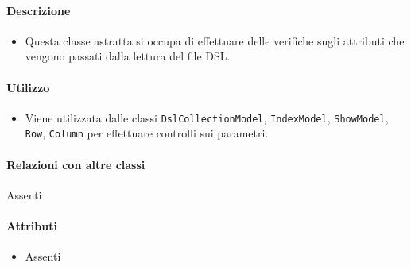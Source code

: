 \paragraph*{Descrizione}
\begin{itemize}
\item[] Questa classe astratta si occupa di effettuare delle verifiche sugli attributi che vengono passati dalla lettura del file DSL.
\end{itemize}

\paragraph*{Utilizzo}
\begin{itemize}
\item[] Viene utilizzata dalle classi \texttt{DslCollectionModel}, \texttt{IndexModel}, \texttt{ShowModel}, \texttt{Row}, \texttt{Column} per effettuare controlli sui parametri.
\end{itemize}

\paragraph*{Relazioni con altre classi}
Assenti

\paragraph*{Attributi}
\begin{itemize}
\item[] Assenti
\end{itemize}

